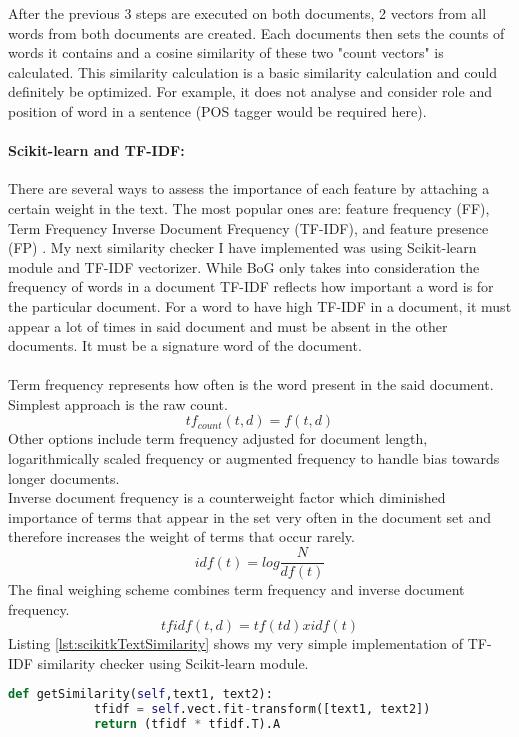 After the previous 3 steps are executed on both documents, 2 vectors from all words from both documents are created. Each documents then sets the counts of words it contains and a cosine similarity of these two "count vectors" is calculated. This similarity calculation is a basic similarity calculation and could definitely be optimized. For example, it does not analyse and consider role and position of word in a sentence (POS tagger would be required here). 

\paragraph{Scikit-learn and TF-IDF:}There are several ways to assess the importance of each feature by attaching a certain weight in the text. The most
popular ones are: feature frequency (FF), Term Frequency Inverse Document Frequency (TF-IDF), and feature presence
(FP) \cite{haddi2013role}. My next similarity checker I have implemented was using Scikit-learn module and TF-IDF vectorizer. While BoG only takes into consideration the frequency of words in a document TF-IDF reflects how important a word is for the particular document. For a word to have high TF-IDF in a document, it must appear a lot of times in said document and must be absent in the other documents. It must be a signature word of the document.\\
\\
Term frequency represents how often is the word present in the said document. Simplest approach is the raw count.
\[ tf_{count}(t,d) = f(t,d) \]
Other options include term frequency adjusted for document length, logarithmically scaled frequency or augmented frequency to handle bias towards longer documents.\\
Inverse document frequency is a counterweight factor which diminished importance of terms that appear in the set very often in the document set and therefore increases the weight of terms that occur rarely.
\[ idf(t) = log \frac{N}{df(t)} \]
The final weighing scheme combines term frequency and inverse document frequency.
\[ tfidf(t,d) = tf(td) x idf(t)		\]
Listing \ref{lst:scikitkTextSimilarity} shows my very simple implementation of TF-IDF similarity checker using Scikit-learn module.

\begin{lstlisting}[caption={Text similarity implementation with Scikit using Tf-Idf model},label={lst:scikitkTextSimilarity},language=Python]
		def getSimilarity(self,text1, text2):
			tfidf = self.vect.fit-transform([text1, text2])
			return (tfidf * tfidf.T).A
\end{lstlisting}

